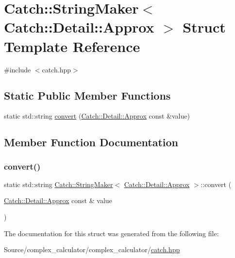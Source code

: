 \hypertarget{struct_catch_1_1_string_maker_3_01_catch_1_1_detail_1_1_approx_01_4}{}\section{Catch\+:\+:String\+Maker$<$ Catch\+:\+:Detail\+:\+:Approx $>$ Struct Template Reference}
\label{struct_catch_1_1_string_maker_3_01_catch_1_1_detail_1_1_approx_01_4}


{\ttfamily \#include $<$catch.\+hpp$>$}

\subsection*{Static Public Member Functions}
\begin{DoxyCompactItemize}
\item 
static std\+::string \mbox{\hyperlink{struct_catch_1_1_string_maker_3_01_catch_1_1_detail_1_1_approx_01_4_a8e5015720682fecfbff0f05de19a698f}{convert}} (\mbox{\hyperlink{class_catch_1_1_detail_1_1_approx}{Catch\+::\+Detail\+::\+Approx}} const \&value)
\end{DoxyCompactItemize}


\subsection{Member Function Documentation}
\mbox{\label{struct_catch_1_1_string_maker_3_01_catch_1_1_detail_1_1_approx_01_4_a8e5015720682fecfbff0f05de19a698f}} 
\subsubsection{\texorpdfstring{convert()}{convert()}}
{\footnotesize\ttfamily static std\+::string \mbox{\hyperlink{struct_catch_1_1_string_maker}{Catch\+::\+String\+Maker}}$<$ \mbox{\hyperlink{class_catch_1_1_detail_1_1_approx}{Catch\+::\+Detail\+::\+Approx}} $>$\+::convert (\begin{DoxyParamCaption}\item[{\mbox{\hyperlink{class_catch_1_1_detail_1_1_approx}{Catch\+::\+Detail\+::\+Approx}} const \&}]{value }\end{DoxyParamCaption})\hspace{0.3cm}{\ttfamily [static]}}



The documentation for this struct was generated from the following file\+:\begin{DoxyCompactItemize}
\item 
Source/complex\+\_\+calculator/complex\+\_\+calculator/\mbox{\hyperlink{catch_8hpp}{catch.\+hpp}}\end{DoxyCompactItemize}
